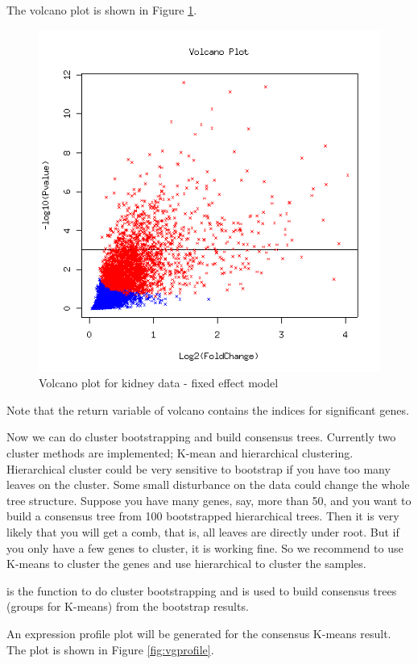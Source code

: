 The volcano plot is shown in Figure \ref{fig:volcano}.
\begin{figure}[htbp]
\centering
\includegraphics{volcano.png}
\caption{Volcano plot for kidney data - fixed effect model}
\label{fig:volcano}
\end{figure}
Note that the return variable of volcano contains the indices
for significant genes.

Now we can do cluster bootstrapping and build consensus trees.
Currently two cluster methods are implemented; K-mean and hierarchical clustering. Hierarchical cluster could be very sensitive to bootstrap
if you have too many leaves on the cluster. 
Some small disturbance on the data could change the whole tree structure. 
Suppose you have many genes, say, more than 50, and you want to build a
consensus tree from 100 bootstrapped hierarchical trees. Then it is very
likely that you will get a comb, that is, all leaves are directly under 
root. But if you only have a few genes to cluster, it is working fine. 
So we recommend to use K-means to cluster the genes and use hierarchical
to cluster the samples. 

 is the function to 
do cluster bootstrapping and 
is used to build consensus trees (groups for K-means) from the 
bootstrap results.
An expression profile plot will be generated for the consensus K-means
result. The plot is shown in Figure \ref{fig:vgprofile}.

